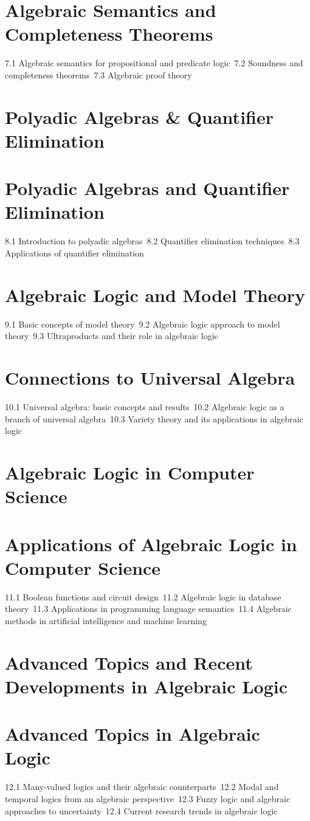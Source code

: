 \section{Algebraic Semantics and Completeness Theorems}
7.1 Algebraic semantics for propositional and predicate logic\
7.2 Soundness and completeness theorems\
7.3 Algebraic proof theory\
\section{Polyadic Algebras \& Quantifier Elimination}
\section{Polyadic Algebras and Quantifier Elimination}
8.1 Introduction to polyadic algebras\
8.2 Quantifier elimination techniques\
8.3 Applications of quantifier elimination\
\section{Algebraic Logic and Model Theory}
9.1 Basic concepts of model theory\
9.2 Algebraic logic approach to model theory\
9.3 Ultraproducts and their role in algebraic logic\
\section{Connections to Universal Algebra}
10.1 Universal algebra: basic concepts and results\
10.2 Algebraic logic as a branch of universal algebra\
10.3 Variety theory and its applications in algebraic logic\
\section{Algebraic Logic in Computer Science}
\section{Applications of Algebraic Logic in Computer Science}
11.1 Boolean functions and circuit design\
11.2 Algebraic logic in database theory\
11.3 Applications in programming language semantics\
11.4 Algebraic methods in artificial intelligence and machine learning\
\section{Advanced Topics and Recent Developments in Algebraic Logic}
\section{Advanced Topics in Algebraic Logic}
12.1 Many-valued logics and their algebraic counterparts\
12.2 Modal and temporal logics from an algebraic perspective\
12.3 Fuzzy logic and algebraic approaches to uncertainty\
12.4 Current research trends in algebraic logic\
